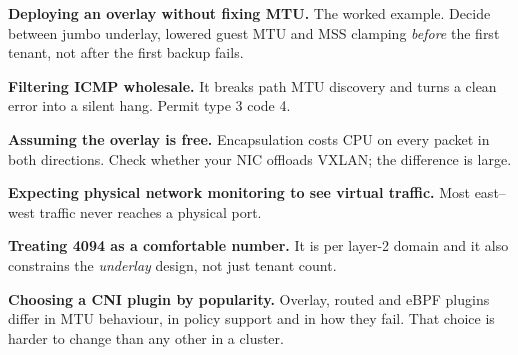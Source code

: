 \begin{pitfall}
\begin{tight}
  \item \textbf{Deploying an overlay without fixing MTU.} The worked example.
        Decide between jumbo underlay, lowered guest MTU and MSS clamping
        \emph{before} the first tenant, not after the first backup fails.
  \item \textbf{Filtering ICMP wholesale.} It breaks path MTU discovery and
        turns a clean error into a silent hang. Permit type 3 code 4.
  \item \textbf{Assuming the overlay is free.} Encapsulation costs CPU on every
        packet in both directions. Check whether your NIC offloads VXLAN; the
        difference is large.
  \item \textbf{Expecting physical network monitoring to see virtual
        traffic.} Most east--west traffic never reaches a physical port.
  \item \textbf{Treating 4094 as a comfortable number.} It is per layer-2
        domain and it also constrains the \emph{underlay} design, not just
        tenant count.
  \item \textbf{Choosing a CNI plugin by popularity.} Overlay, routed and eBPF
        plugins differ in MTU behaviour, in policy support and in how they fail.
        That choice is harder to change than any other in a cluster.
\end{tight}
\end{pitfall}

